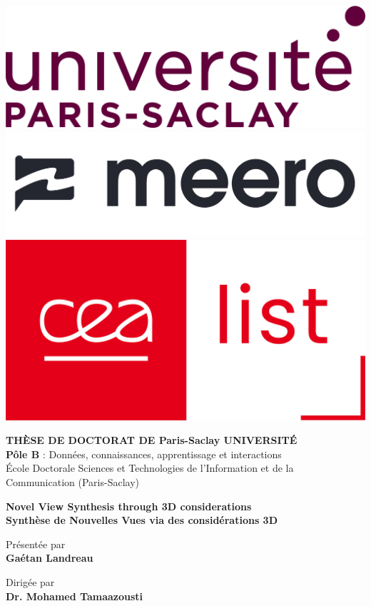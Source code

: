 \begin{titlepage}

    \vspace*{-2.5cm}
    \includegraphics[height=0.1\columnwidth]{images/saclay.png}
    \hspace*{.5cm}
    \includegraphics[height=0.1\columnwidth]{images/meero.jpg}
    \hspace*{.5cm}
    \includegraphics[height=0.1\columnwidth]{images/cea_list.png}
    \vspace*{0.5cm}
  
    \begin{center}
  
      {\large \textbf{T\normalsize{HÈSE DE}\large{} D\normalsize{OCTORAT DE}\large{} P\normalsize{aris}\large{}-S\normalsize{aclay}\large{} U\normalsize{NIVERSITÉ}}}\\
      \textbf{Pôle B} : Données, connaissances, apprentissage et interactions \\
      École Doctorale Sciences et Technologies de l'Information et de la Communication (Paris-Saclay)
  
      \vspace*{1.5cm}
  
      {\Large \textbf{Novel View Synthesis through 3D considerations}} \\[0.5em]
      {\large \textbf{Synthèse de Nouvelles Vues via des considérations 3D}}
  
      \vspace*{1.2cm}
  
      Présentée par\\
      {\large \textbf{Gaétan {Landreau}}}
  
      \vspace*{2mm}
  
      Dirigée par\\
      \textbf{Dr. Mohamed {Tamaazousti}}
  
      \vspace*{5mm}
  

\end{center}
\end{titlepage}
